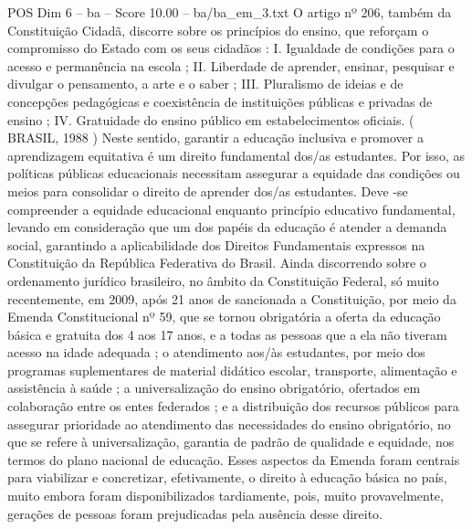 \begin{textsample}{POS Dim 6 – ba – Score 10.00 – ba/ba\_em\_3.txt}
O artigo nº 206, também da Constituição Cidadã, discorre sobre os princípios do ensino, que reforçam o compromisso do Estado com os seus cidadãos : I.
Igualdade de condições para o acesso e permanência na escola ; II.
Liberdade de aprender, ensinar, pesquisar e divulgar o pensamento, a arte e o saber ; III.
Pluralismo de ideias e de concepções pedagógicas e coexistência de instituições públicas e privadas de ensino ; IV.
Gratuidade do ensino público em estabelecimentos oficiais. ( BRASIL, 1988 ) Neste sentido, garantir a educação inclusiva e promover a aprendizagem equitativa é um direito fundamental dos/as estudantes.
Por isso, as políticas públicas educacionais necessitam assegurar a equidade das condições ou meios para consolidar o direito de aprender dos/as estudantes.
Deve -se compreender a equidade educacional enquanto princípio educativo fundamental, levando em consideração que um dos papéis da educação é atender a demanda social, garantindo a aplicabilidade dos Direitos Fundamentais expressos na Constituição da República Federativa do Brasil.
Ainda discorrendo sobre o ordenamento jurídico brasileiro, no âmbito da Constituição Federal, só muito recentemente, em 2009, após 21 anos de sancionada a Constituição, por meio da Emenda Constitucional nº 59, que se tornou obrigatória a oferta da educação básica e gratuita dos 4 aos 17 anos, e a todas as pessoas que a ela não tiveram acesso na idade adequada ; o atendimento aos/às estudantes, por meio dos programas suplementares de material didático escolar, transporte, alimentação e assistência à saúde ; a universalização do ensino obrigatório, ofertados em colaboração entre os entes federados ; e a distribuição dos recursos públicos para assegurar prioridade ao atendimento das necessidades do ensino obrigatório, no que se refere à universalização, garantia de padrão de qualidade e equidade, nos termos do plano nacional de educação.
Esses aspectos da Emenda foram centrais para viabilizar e concretizar, efetivamente, o direito à educação básica no país, muito embora foram disponibilizados tardiamente, pois, muito provavelmente, gerações de pessoas foram prejudicadas pela ausência desse direito.

\end{textsample}
